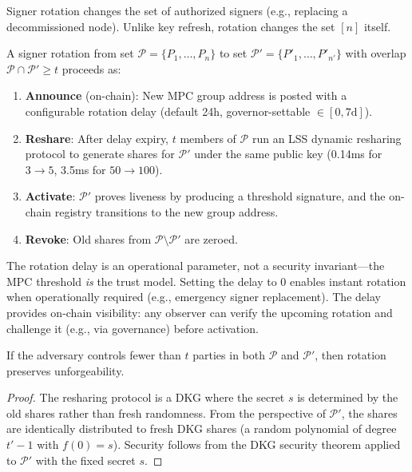 Signer rotation changes the set of authorized signers (e.g., replacing a
decommissioned node). Unlike key refresh, rotation changes the set $[n]$ itself.

\begin{definition}
A signer rotation from set $\mathcal{P} = \{P_1, \ldots, P_n\}$ to set
$\mathcal{P}' = \{P'_1, \ldots, P'_{n'}\}$ with overlap
$\mathcal{P} \cap \mathcal{P}' \geq t$ proceeds as:
\begin{enumerate}[nosep]
  \item \textbf{Announce} (on-chain): New MPC group address is posted with a
    configurable rotation delay (default 24h, governor-settable $\in [0, 7\text{d}]$).
  \item \textbf{Reshare}: After delay expiry, $t$ members of $\mathcal{P}$ run an LSS
    dynamic resharing protocol to generate shares for $\mathcal{P}'$ under the same
    public key (0.14ms for $3 \to 5$, 3.5ms for $50 \to 100$).
  \item \textbf{Activate}: $\mathcal{P}'$ proves liveness by producing a threshold
    signature, and the on-chain registry transitions to the new group address.
  \item \textbf{Revoke}: Old shares from $\mathcal{P} \setminus \mathcal{P}'$ are
    zeroed.
\end{enumerate}
\end{definition}

The rotation delay is an operational parameter, not a security invariant---the MPC
threshold \emph{is} the trust model. Setting the delay to 0 enables instant rotation
when operationally required (e.g., emergency signer replacement). The delay provides
on-chain visibility: any observer can verify the upcoming rotation and challenge it
(e.g., via governance) before activation.

\begin{theorem}
\label{thm:rotation-sec}
If the adversary controls fewer than $t$ parties in both $\mathcal{P}$ and
$\mathcal{P}'$, then rotation preserves unforgeability.
\end{theorem}

\begin{proof}
The resharing protocol is a DKG where the secret $s$ is determined by the old shares
rather than fresh randomness. From the perspective of $\mathcal{P}'$, the shares are
identically distributed to fresh DKG shares (a random polynomial of degree $t'-1$ with
$f(0) = s$). Security follows from the DKG security theorem applied to $\mathcal{P}'$
with the fixed secret $s$.
\end{proof}

